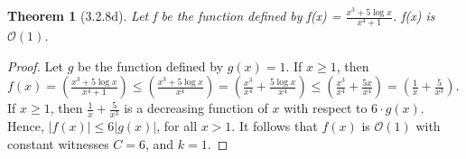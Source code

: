 \documentclass[a4paper, 12pt]{article}
\theoremstyle{plain}
\newtheorem*{theorem*}{Theorem}
\begin{document}
	
	\begin{theorem*}[3.2.8d]
		Let f be the function defined by f(x) = $\frac{x^{3} + 5 \log x}{x^{4} + 1}$. \newline f(x) is $\mathcal{O}(1)$.
	\end{theorem*}
	
	\begin{proof}
		Let $g$ be the function defined by $g(x) = 1$. If $x \ge 1$, then 
		\newline \newline \indent
		$f(x) = \left( \frac{x^{3} + 5 \log x}{x^{4} + 1} \right) \le \left( \frac{x^{3} + 5 \log x}{x^{4}} \right) = \left( \frac{x^{3}}{x^{4}} + \frac{5 \log x}{x^{4}} \right) \le \left( \frac{x^{3}}{x^{4}} + \frac{5x}{x^{4}} \right) = \left( \frac{1}{x} + \frac{5}{x^{3}} \right)$. \newline \newline If $x \ge 1$, then $\frac{1}{x} + \frac{5}{x^{3}}$ is a decreasing function of $x$ with respect to $6 \cdot g(x)$. Hence, $|f(x)| \le 6|g(x)|$, for all $x > 1$. It follows that $f(x)$ is $\mathcal{O}(1)$ with constant witnesses $C = 6$, and $k = 1$.
	\end{proof}
\end{document}

